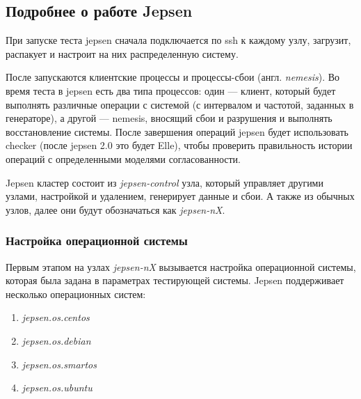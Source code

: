 \documentclass[14pt,  openany]{book}
\begin{document}
\subsection{Подробнее о работе Jepsen}
При запуске теста jepsen сначала подключается по ssh к каждому узлу, загрузит, распакует и настроит на них распределенную систему.
\par После запускаются клиентские процессы и процессы-сбои (англ. \textit{nemesis}). Во время теста в jepsen есть два типа процессов: один --- клиент, который будет выполнять различные операции с системой (с интервалом и частотой, заданных в генераторе), а другой --- nemesis, вносящий сбои и разрушения и выполнять восстановление системы. После завершения операций jepsen будет использовать checker (после jepsen 2.0 это будет Elle), чтобы проверить правильность истории операций с определенными моделями согласованности.
\par Jepsen кластер состоит из \textit{jepsen-control} узла, который управляет другими узлами, настройкой и удалением, генерирует данные и сбои. А также из обычных узлов, далее они будут обозначаться как \textit{jepsen-nX}. 
\subsubsection{Настройка операционной системы}
Первым этапом на узлах \textit{jepsen-nX} вызывается настройка операционной системы,  которая была задана в параметрах тестирующей системы. Jepsen поддерживает несколько операционных систем: 
\begin{enumerate}
\item \textit{jepsen.os.centos}
\item \textit{jepsen.os.debian}
\item \textit{jepsen.os.smartos}
\item \textit{jepsen.os.ubuntu}
\end{enumerate}
\end{document}
